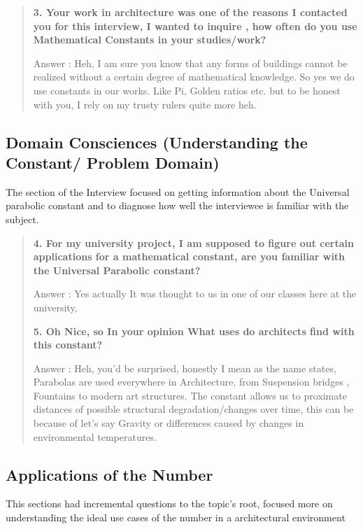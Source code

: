 \documentclass[12pt]{report}
\begin{document}
\begin{flushleft}
\begin{quote}
    \textbf{3. Your work in architecture was one of the reasons I contacted you for this interview, I wanted to inquire , how often do you use Mathematical Constants in your studies/work? }
    
    Answer : Heh, I am sure you know that any forms of  buildings cannot be realized without a certain degree of mathematical knowledge. So yes we do use constants in our works. Like Pi, Golden ratios etc. but to be honest with you,  I rely on my trusty rulers quite more heh. 
    \hfill \break
    \end{quote} 
    
    
    
    \subsection{Domain Consciences (Understanding the Constant/ Problem Domain)}
    
    The section of the Interview focused on getting information about the Universal parabolic constant and to diagnose how well the interviewee is familiar with the subject.
     \hfill 
    \begin{quote}
    \textbf{4. For my university project, I am supposed to figure out certain applications for a mathematical constant, are you familiar with the Universal Parabolic constant?}
    
    Answer : Yes actually It was thought to us in one of our classes here at the university, \hfill \break
   
    \textbf{5. Oh Nice, so In your opinion What uses do architects find with this constant? }
    
    Answer : Heh, you'd be surprised, honestly I mean as the name states, Parabolas are used everywhere in Architecture, from Suspension bridges , Fountains  to modern art structures. The constant allows us to proximate distances of possible structural degradation/changes over time, this can be because of let's say Gravity or  differences caused by changes in environmental temperatures. \hfill \break
    \end {quote}
    
    \subsection{Applications of the Number}
 This sections had incremental questions to the topic's root, focused more on understanding the ideal use cases of the number in a architectural environment  
     \hfill \break


\end{flushleft}
\end{document}
